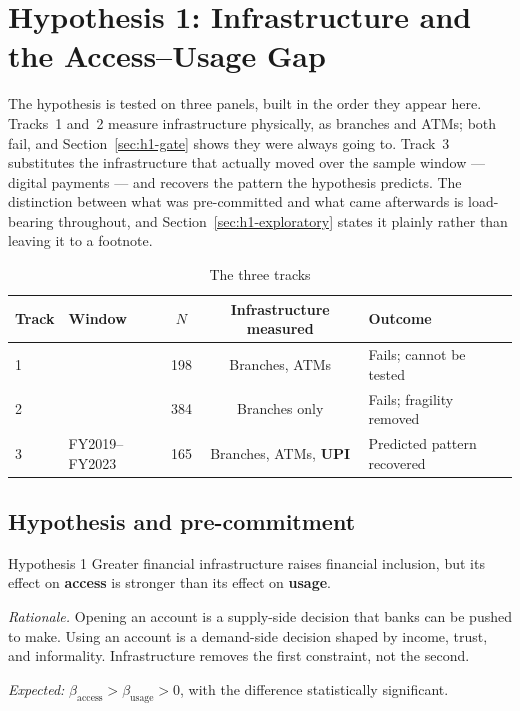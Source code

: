 \chapter{Hypothesis 1: Infrastructure and the Access--Usage Gap}
\label{ch:h1}

The hypothesis is tested on three panels, built in the order they appear here. Tracks~1 and~2
measure infrastructure physically, as branches and ATMs; both fail, and
Section~\ref{sec:h1-gate} shows they were always going to. Track~3 substitutes the infrastructure
that actually moved over the sample window --- digital payments --- and recovers the pattern the
hypothesis predicts. The distinction between what was pre-committed and what came afterwards is
load-bearing throughout, and Section~\ref{sec:h1-exploratory} states it plainly rather than
leaving it to a footnote.

\begin{table}[H]
\centering
\caption{The three tracks}
\label{tab:tracks}
\small
\begin{tabular}{@{}llccl@{}}
\toprule
Track & Window & $N$ & Infrastructure measured & Outcome \\
\midrule
1 & \panelA{} & 198 & Branches, ATMs & Fails; cannot be tested \\
2 & \panelB{} & 384 & Branches only & Fails; fragility removed \\
3 & FY2019--FY2023 & 165 & Branches, ATMs, \textbf{UPI} & Predicted pattern recovered \\
\bottomrule
\end{tabular}
\end{table}

\section{Hypothesis and pre-commitment}
\label{sec:h1-hypothesis}

\begin{keybox}{Hypothesis 1}
Greater financial infrastructure raises financial inclusion, but its effect on \textbf{access} is
stronger than its effect on \textbf{usage}.

\medskip
\emph{Rationale.} Opening an account is a supply-side decision that banks can be pushed to make.
Using an account is a demand-side decision shaped by income, trust, and informality.
Infrastructure removes the first constraint, not the second.

\medskip
\emph{Expected:} $\beta_{\text{access}} > \beta_{\text{usage}} > 0$, with the difference
statistically significant.
\end{keybox}

